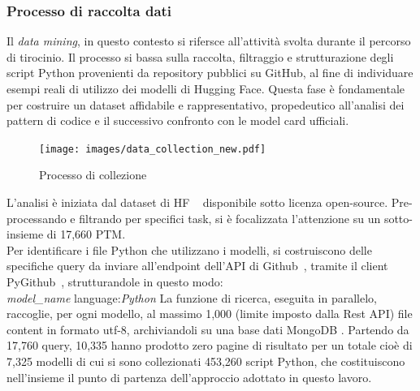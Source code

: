 \documentclass{article}
\begin{document}
\subsubsection{Processo di raccolta dati} \label{tirocinio}
Il \textit{data mining}, in questo contesto si rifersce all'attività svolta durante il percorso di tirocinio. Il processo si bassa sulla raccolta, filtraggio e strutturazione degli script Python provenienti da repository pubblici su GitHub, al fine di individuare esempi reali di utilizzo dei modelli di Hugging Face. Questa fase è fondamentale per costruire un dataset affidabile e rappresentativo, propedeutico all'analisi dei pattern di codice e il successivo confronto con le model card ufficiali.
\begin{figure}[htbp]
    \centering
    \texttt{[image: images/data\_collection\_new.pdf]}
    \caption{Processo di collezione~\cite{CodeXHug}}
    \label{fig:tirocinio}
\end{figure}
L'analisi è iniziata dal dataset di HF ~\cite{ait_hfcommunity_2023} disponibile sotto licenza open-source. Pre-processando e filtrando per specifici task, si è focalizzata l'attenzione su un sotto-insieme di 17,660 PTM.\\
Per identificare i file Python che utilizzano i modelli, si costruiscono delle specifiche query da inviare all'endpoint dell'API di Github~\cite{github_rest}, tramite il client PyGithub~\cite{pygithub}, strutturandole in questo modo:\\
\emph{model\_name} language:\emph{Python}
La funzione di ricerca, eseguita in parallelo, raccoglie, per ogni modello, al massimo 1,000 (limite imposto dalla Rest API) file content in formato utf-8, archiviandoli su una base dati MongoDB \cite{pymongo}. 
Partendo da 17,760 query, 10,335 hanno prodotto zero pagine di risultato per un totale cioè di 7,325 modelli di cui si sono collezionati 453,260 script Python, che costituiscono nell'insieme il punto di partenza dell'approccio adottato in questo lavoro.\\
\end{document}
